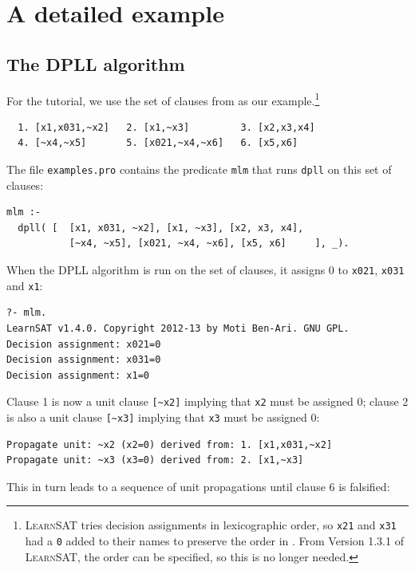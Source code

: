 \documentclass[11pt]{report}
\newcommand*{\p}[1]{\textup{\texttt{#1}}}
\newcommand*{\ls}{\textsc{LearnSAT}}
\begin{document}
\newpage

\chapter{A detailed example}\label{ch.mlm}

\section{The DPLL algorithm}

For the tutorial, we use the set of clauses from \cite{mlm} as our
example.\footnote{\ls{} tries decision assignments in lexicographic
order, so \p{x21} and \p{x31} had a \p{0} added to their names to
preserve the order in \cite{mlm}. From Version 1.3.1 of \ls{}, the order
can be specified, so this is no longer needed.}

\begin{verbatim}
  1. [x1,x031,~x2]   2. [x1,~x3]         3. [x2,x3,x4]
  4. [~x4,~x5]       5. [x021,~x4,~x6]   6. [x5,x6]
\end{verbatim}

The file \p{examples.pro} contains the predicate \p{mlm} that runs
\p{dpll} on this set of clauses:

\begin{verbatim}
mlm :-
  dpll( [  [x1, x031, ~x2], [x1, ~x3], [x2, x3, x4],
           [~x4, ~x5], [x021, ~x4, ~x6], [x5, x6]     ], _).
\end{verbatim}

When the DPLL algorithm is run on the set of clauses, it assigns
0 to \p{x021}, \p{x031} and \p{x1}:

\begin{verbatim}
?- mlm.
LearnSAT v1.4.0. Copyright 2012-13 by Moti Ben-Ari. GNU GPL.
Decision assignment: x021=0
Decision assignment: x031=0
Decision assignment: x1=0
\end{verbatim}

Clause 1 is now a unit clause \verb+[~x2]+ implying that \p{x2} must be
assigned 0; clause 2 is also a unit clause \verb+[~x3]+ implying that
\p{x3} must be assigned 0:

\begin{verbatim}
Propagate unit: ~x2 (x2=0) derived from: 1. [x1,x031,~x2]
Propagate unit: ~x3 (x3=0) derived from: 2. [x1,~x3]
\end{verbatim}

This in turn leads to a sequence of unit propagations until clause 6
is falsified:
\end{document}
